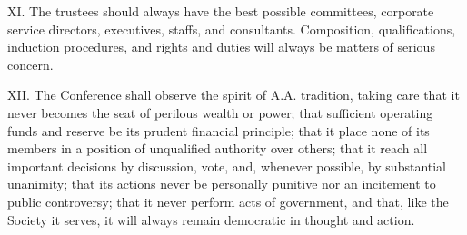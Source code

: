 \begin{biblechapter}
\verse XI. The trustees should always have the best possible committees, 
    corporate service directors, executives, staffs, and consultants.
    Composition, qualifications, induction procedures, 
    and rights and duties will always be matters of serious concern.

\verse XII. The Conference shall observe the spirit of A.A. tradition,
    taking care that it never becomes 
    the seat of perilous wealth or power;
    that sufficient operating funds and reserve 
    be its prudent financial principle;
    that it place none of its members in a position 
    of unqualified authority over others; 
    that it reach all important decisions by 
    discussion, vote, and, whenever possible, by substantial unanimity;
    that its actions never be personally punitive 
    nor an incitement to public controversy;
    that it never perform acts of government, and that, 
    like the Society it serves, 
    it will always remain democratic in thought and action.
\end{biblechapter}

